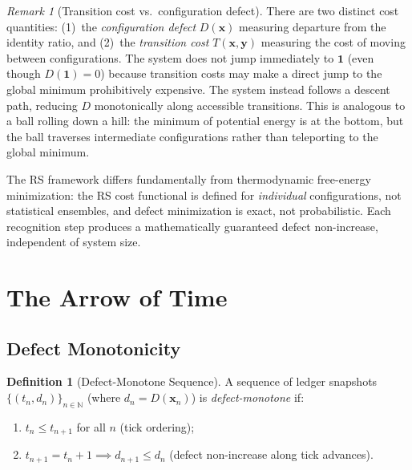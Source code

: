 \documentclass[12pt,a4paper]{article}
\theoremstyle{definition}
\newtheorem{definition}[theorem]{Definition}
\theoremstyle{remark}
\newtheorem{remark}[theorem]{Remark}
\begin{document}
\begin{remark}[Transition cost vs.\ configuration defect]
\label{rem:transition-cost}
There are two distinct cost quantities: (1)~the \emph{configuration
defect} $D(\mathbf{x})$ measuring departure from the identity ratio, and
(2)~the \emph{transition cost} $T(\mathbf{x}, \mathbf{y})$ measuring the
cost of moving between configurations.  The system does not jump
immediately to $\mathbf{1}$ (even though $D(\mathbf{1}) = 0$) because
transition costs may make a direct jump to the global minimum
prohibitively expensive.  The system instead follows a descent path,
reducing $D$ monotonically along accessible transitions.  This is
analogous to a ball rolling down a hill: the minimum of potential energy
is at the bottom, but the ball traverses intermediate configurations
rather than teleporting to the global minimum.

The RS framework differs fundamentally from thermodynamic free-energy
minimization: the RS cost functional is defined for \emph{individual}
configurations, not statistical ensembles, and defect minimization is
exact, not probabilistic.  Each recognition step produces a
mathematically guaranteed defect non-increase, independent of system
size.
\end{remark}

\section{The Arrow of Time}
\label{sec:arrow}

\subsection{Defect Monotonicity}

\begin{definition}[Defect-Monotone Sequence]
\label{def:defect-mono}
A sequence of ledger snapshots
$\{(t_n, d_n)\}_{n \in \mathbb{N}}$ (where $d_n = D(\mathbf{x}_n)$) is
\emph{defect-monotone} if:
\begin{enumerate}[label=(\alph*),nosep]
  \item $t_n \leq t_{n+1}$ for all $n$ (tick ordering);
  \item $t_{n+1} = t_n + 1 \implies d_{n+1} \leq d_n$ (defect
  non-increase along tick advances).
\end{enumerate}
\end{definition}
\end{document}
